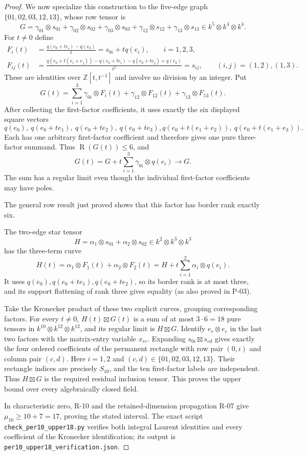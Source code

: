 \begin{proof}
We now specialize this construction to the five-edge graph
$\{01,02,03,12,13\}$, whose row tensor is
\[
 G=\gamma_{01}\otimes s_{01}
   +\gamma_{02}\otimes s_{02}
   +\gamma_{03}\otimes s_{03}
   +\gamma_{12}\otimes s_{12}
   +\gamma_{13}\otimes s_{13}
 \in k^5\otimes k^4\otimes k^4.
\]
For $t\ne0$ define
\begin{align*}
 F_i(t)&=\frac{q(e_0+t e_i)-q(e_0)}{t}
       =s_{0i}+tq(e_i),\qquad i=1,2,3,\\
 F_{ij}(t)&=\frac{q(e_0+t(e_i+e_j))-q(e_0+t e_i)
                    -q(e_0+t e_j)+q(e_0)}{t^2}
       =s_{ij},\qquad (i,j)=(1,2),(1,3).
\end{align*}
These are identities over $\mathbb Z[t,t^{-1}]$ and involve no division
by an integer.  Put
\[
 G(t)=\sum_{i=1}^3\gamma_{0i}\otimes F_i(t)
       +\gamma_{12}\otimes F_{12}(t)
       +\gamma_{13}\otimes F_{13}(t).
\]
After collecting the first-factor coefficients, it uses exactly the
six displayed square vectors
\[
 q(e_0),\ q(e_0+t e_1),\ q(e_0+t e_2),\ q(e_0+t e_3),
 q(e_0+t(e_1+e_2)),\ q(e_0+t(e_1+e_3)).
\]
Each has one arbitrary first-factor coefficient and therefore gives
one pure three-factor summand.  Thus $\operatorname R(G(t))\le6$, and
\[
 G(t)=G+t\sum_{i=1}^3\gamma_{0i}\otimes q(e_i)
 \longrightarrow G.
\]
The sum has a regular limit even though the individual first-factor
coefficients may have poles.

The general row result just proved shows that this factor has border
rank exactly six.

The two-edge star tensor
\[
 H=\alpha_1\otimes s_{01}+\alpha_2\otimes s_{02}
       \in k^2\otimes k^3\otimes k^3
\]
has the three-term curve
\[
 H(t)=\alpha_1\otimes F_1(t)+\alpha_2\otimes F_2(t)
      =H+t\sum_{i=1}^2\alpha_i\otimes q(e_i).
\]
It uses $q(e_0),q(e_0+t e_1),q(e_0+t e_2)$, so its border rank is at
most three, and its support flattening of rank three gives equality
(as also proved in P-03).

Take the Kronecker product of these two explicit curves, grouping
corresponding factors.  For every $t\ne0$, $H(t)\boxtimes G(t)$ is a
sum of at most $3\cdot6=18$ pure tensors in
$k^{10}\otimes k^{12}\otimes k^{12}$, and its regular limit is
$H\boxtimes G$.  Identify $e_r\otimes e_c$ in the last two factors
with the matrix-entry variable $x_{rc}$.  Expanding
$s_{0i}\boxtimes s_{cd}$ gives exactly the four ordered coefficients
of the permanent rectangle with row pair $(0,i)$ and column pair
$(c,d)$.  Here $i=1,2$ and
$(c,d)\in\{01,02,03,12,13\}$.  Their rectangle indices are precisely
$S_{10}$, and the ten first-factor labels are independent.
Thus $H\boxtimes G$ is the required residual inclusion tensor.
This proves the upper bound over every algebraically closed field.

In characteristic zero, R-10 and the retained-dimension propagation
R-07 give $\mu_{10}\ge10+7=17$, proving the stated interval.
The exact script \texttt{check\_per10\_upper18.py} verifies both
integral Laurent identities and every coefficient of the Kronecker
identification; its output is
\texttt{per10\_upper18\_verification.json}.
\end{proof}


